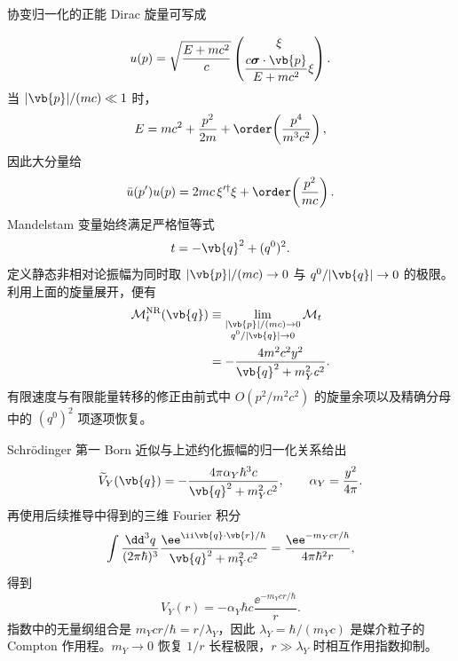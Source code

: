 \begin{derivation}
协变归一化的正能 Dirac 旋量可写成

\begin{equation*}
 u(p)=\sqrt{\frac{E+mc^2}{c}}
 \begin{pmatrix}
 \xi\\[1mm]
 \dfrac{c\boldsymbol\sigma\cdot\vb{p}}{E+mc^2}\xi
 \end{pmatrix}.
\end{equation*}
当 $|\vb{p}|/(mc)\ll1$ 时，
\begin{equation*}
 E=mc^2+\frac{p^2}{2m}+\order\!\left(\frac{p^4}{m^3c^2}\right),
\end{equation*}
因此大分量给
\begin{equation*}
 \bar u(p')u(p)
 =2mc\,\xi'^\dagger\xi
 +\order\!\left(\frac{p^2}{mc}\right).
\end{equation*}
Mandelstam 变量始终满足严格恒等式
\begin{equation*}
 t=-\vb{q}^2+(q^0)^2.
\end{equation*}
定义静态非相对论振幅为同时取 $|\vb{p}|/(mc)\to0$ 与 $q^0/|\vb{q}|\to0$ 的极限。利用上面的旋量展开，便有
\begin{align*}
 \mathcal M_t^{\rm NR}(\vb{q})
 &\equiv
 \lim_{\substack{|\vb{p}|/(mc)\to0\\ q^0/|\vb{q}|\to0}}
 \mathcal M_t\\
 &=-\frac{4m^2c^2y^2}{\vb{q}^2+m_Y^2c^2}.
\end{align*}
有限速度与有限能量转移的修正由前式中 $O(p^2/m^2c^2)$ 的旋量余项以及精确分母中的 $(q^0)^2$ 项逐项恢复。

Schr\"odinger 第一 Born 近似与上述约化振幅的归一化关系给出
\begin{equation*}
 \widetilde V_Y(\vb{q})
 =-\frac{4\pi\alpha_Y\hbar^3c}
 {\vb{q}^2+m_Y^2c^2},
 \qquad \alpha_Y=\frac{y^2}{4\pi}.
\end{equation*}
再使用后续推导中得到的三维 Fourier 积分
\begin{equation*}
 \int\frac{\dd^3 q}{(2\pi\hbar)^3}
 \frac{\ee^{\ii\vb{q}\cdot\vb{r}/\hbar}}
 {\vb{q}^2+m_Y^2c^2}
 =\frac{\ee^{-m_Ycr/\hbar}}{4\pi\hbar^2r},
\end{equation*}
得到
\begin{equation*}
 V_Y(r)=-\alpha_Y\hbar c\frac{\ee^{-m_Ycr/\hbar}}{r}.
\end{equation*}
指数中的无量纲组合是 $m_Ycr/\hbar=r/\lambda_Y$，因此 $\lambda_Y=\hbar/(m_Yc)$ 是媒介粒子的 Compton 作用程。$m_Y\to0$ 恢复 $1/r$ 长程极限，$r\gg\lambda_Y$ 时相互作用指数抑制。
\end{derivation}

